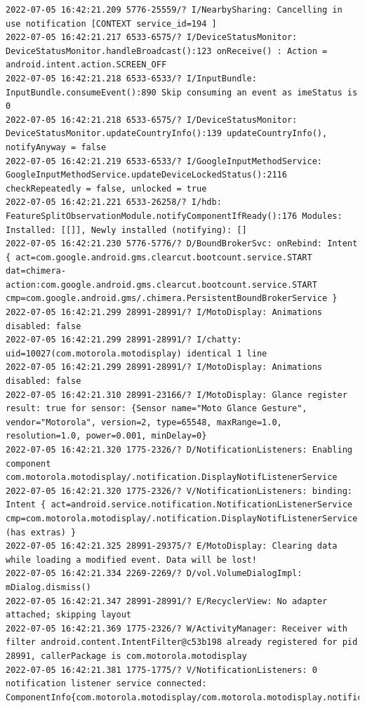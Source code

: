 \documentclass[a4paper,12pt]{book}
\begin{document}
\begin{lstlisting}
2022-07-05 16:42:21.209 5776-25559/? I/NearbySharing: Cancelling in use notification [CONTEXT service_id=194 ]
2022-07-05 16:42:21.217 6533-6575/? I/DeviceStatusMonitor: DeviceStatusMonitor.handleBroadcast():123 onReceive() : Action = android.intent.action.SCREEN_OFF
2022-07-05 16:42:21.218 6533-6533/? I/InputBundle: InputBundle.consumeEvent():890 Skip consuming an event as imeStatus is 0
2022-07-05 16:42:21.218 6533-6575/? I/DeviceStatusMonitor: DeviceStatusMonitor.updateCountryInfo():139 updateCountryInfo(), notifyAnyway = false
2022-07-05 16:42:21.219 6533-6533/? I/GoogleInputMethodService: GoogleInputMethodService.updateDeviceLockedStatus():2116 checkRepeatedly = false, unlocked = true
2022-07-05 16:42:21.221 6533-26258/? I/hdb: FeatureSplitObservationModule.notifyComponentIfReady():176 Modules: Installed: [[]], Newly installed (notifying): []
2022-07-05 16:42:21.230 5776-5776/? D/BoundBrokerSvc: onRebind: Intent { act=com.google.android.gms.clearcut.bootcount.service.START dat=chimera-action:com.google.android.gms.clearcut.bootcount.service.START cmp=com.google.android.gms/.chimera.PersistentBoundBrokerService }
2022-07-05 16:42:21.299 28991-28991/? I/MotoDisplay: Animations disabled: false
2022-07-05 16:42:21.299 28991-28991/? I/chatty: uid=10027(com.motorola.motodisplay) identical 1 line
2022-07-05 16:42:21.299 28991-28991/? I/MotoDisplay: Animations disabled: false
2022-07-05 16:42:21.310 28991-23166/? I/MotoDisplay: Glance register result: true for sensor: {Sensor name="Moto Glance Gesture", vendor="Motorola", version=2, type=65548, maxRange=1.0, resolution=1.0, power=0.001, minDelay=0}
2022-07-05 16:42:21.320 1775-2326/? D/NotificationListeners: Enabling component com.motorola.motodisplay/.notification.DisplayNotifListenerService
2022-07-05 16:42:21.320 1775-2326/? V/NotificationListeners: binding: Intent { act=android.service.notification.NotificationListenerService cmp=com.motorola.motodisplay/.notification.DisplayNotifListenerService (has extras) }
2022-07-05 16:42:21.325 28991-29375/? E/MotoDisplay: Clearing data while loading a modified event. Data will be lost!
2022-07-05 16:42:21.334 2269-2269/? D/vol.VolumeDialogImpl: mDialog.dismiss()
2022-07-05 16:42:21.347 28991-28991/? E/RecyclerView: No adapter attached; skipping layout
2022-07-05 16:42:21.369 1775-2326/? W/ActivityManager: Receiver with filter android.content.IntentFilter@c53b198 already registered for pid 28991, callerPackage is com.motorola.motodisplay
2022-07-05 16:42:21.381 1775-1775/? V/NotificationListeners: 0 notification listener service connected: ComponentInfo{com.motorola.motodisplay/com.motorola.motodisplay.notification.DisplayNotifListenerService}

\end{lstlisting}
\end{document}
